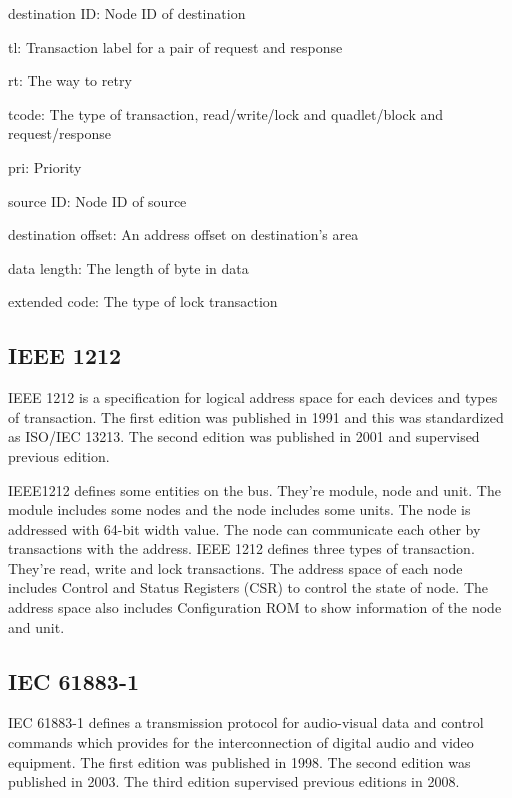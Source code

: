 \documentclass[onecolumn]{article}
\begin{document}
\begin{description}
\item{destination ID:}
Node ID of destination
\item{tl:}
Transaction label for a pair of request and response
\item{rt:}
The way to retry
\item{tcode:}
The type of transaction, read/write/lock and quadlet/block and request/response
\item{pri:}
Priority
\item{source ID:}
Node ID of source
\item{destination offset:}
An address offset on destination's area
\item{data length:}
The length of byte in data
\item{extended code:}
The type of lock transaction
\end{description}

\subsection{IEEE 1212}

IEEE 1212 is a specification for logical address space for each devices and types of transaction. The first edition was published in 1991\cite{ieee1212-1} and this was standardized as ISO/IEC 13213\cite{iso13213}. The second edition was published in 2001\cite{ieee1212-2} and supervised previous edition.

IEEE1212 defines some entities on the bus. They're module, node and unit. The module includes some nodes and the node includes some units. The node is addressed with 64-bit width value. The node can communicate each other by transactions with the address. IEEE 1212 defines three types of transaction. They're read, write and lock transactions. The address space of each node includes Control and Status Registers (CSR) to control the state of node. The address space also includes Configuration ROM to show information of the node and unit.


\subsection{IEC 61883-1}

IEC 61883-1 defines a transmission protocol for audio-visual data and control commands which provides for the interconnection of digital audio and video equipment. The first edition was published in 1998\cite{iec61883-1-1}. The second edition was published in 2003\cite{iec61883-1-2}. The third edition supervised previous editions in 2008\cite{iec61883-1-3}.
\end{document}

